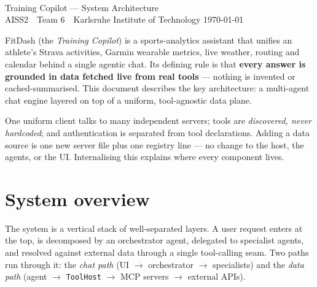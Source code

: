 \documentclass[11pt,a4paper]{article}
\newcommand{\code}[1]{{\small\texttt{#1}}}
\begin{document}
\begin{tcolorbox}[colback=fdNavy,colframe=fdNavy,boxrule=0pt,rounded corners,
                  left=14pt,right=14pt,top=12pt,bottom=12pt]
  \color{white}{\Huge\bfseries FitDash}\\[3pt]
  {\large\color{white} Training Copilot --- System Architecture}\\[8pt]
  {\small\color{fdTeal} AISS2 \,\textbullet\, Team 6 \,\textbullet\, Karlsruhe Institute of Technology
   \hfill \today}
\end{tcolorbox}

\vspace{0.6em}

\noindent
FitDash (the \emph{Training Copilot}) is a sports-analytics assistant that unifies an
athlete's Strava activities, Garmin wearable metrics, live weather, routing and calendar
behind a single agentic chat. Its defining rule is that \textbf{every answer is grounded in
data fetched live from real tools} --- nothing is invented or cached-summarised. This
document describes the key architecture: a multi-agent chat engine layered on top of a
uniform, tool-agnostic data plane.

\begin{tcolorbox}[colback=fdTeal!8,colframe=fdTeal,coltitle=fdNavy,fonttitle=\bfseries,
                  title=The load-bearing idea: MCP-standard and tool-agnostic,
                  boxrule=1pt,rounded corners,left=8pt,right=8pt,top=5pt,bottom=5pt]
One uniform client talks to many independent servers; tools are \emph{discovered, never
hardcoded}; and authentication is separated from tool declarations. Adding a data source
is one new server file plus one registry line --- no change to the host, the agents, or the
UI. Internalising this explains where every component lives.
\end{tcolorbox}

\section{System overview}
The system is a vertical stack of well-separated layers. A user request enters at the top,
is decomposed by an orchestrator agent, delegated to specialist agents, and resolved against
external data through a single tool-calling seam. Two paths run through it: the \emph{chat
path} (UI $\rightarrow$ orchestrator $\rightarrow$ specialists) and the \emph{data path}
(agent $\rightarrow$ \code{ToolHost} $\rightarrow$ MCP servers $\rightarrow$ external APIs).
\end{document}
